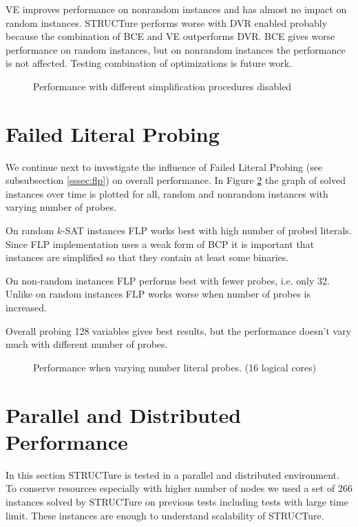 VE improves performance on nonrandom instances and has almost no
impact on random instances. STRUCTure performs worse with DVR
enabled probably because the combination of BCE and VE outperforms
DVR. BCE gives worse performance on random instances, but on
nonrandom instances the performance is not affected. Testing
combination of optimizations is future work.

\begin{figure}
  \centering
  \caption{Performance with different simplification procedures disabled}
  \label{fig:disable}
\end{figure}


\section{Failed Literal Probing}

We continue next to investigate the influence of Failed
Literal Probing (see subsubsection \ref{sssec:flp}) on overall
performance. In Figure \ref{fig:flp} the graph of solved instances
over time is plotted for all, random and nonrandom instances with
varying number of probes.

On random $k$-SAT instances FLP works best with high number of
probed literals. Since FLP implementation uses a weak form of BCP
it is important that instances are simplified so that they contain
at least some binaries.

On non-random instances FLP performs best with fewer probes,
i.e. only 32.  Unlike on random instances FLP works worse when
number of probes is increased.

Overall probing 128 variables gives best results, but the performance
doesn't vary much with different number of probes.

\begin{figure}
  \centering
  \caption{Performance when varying number literal probes. (16 logical cores)}
  \label{fig:flp}
\end{figure}


\section{Parallel and Distributed Performance}

In this section STRUCTure is tested in a parallel and distributed
environment. To conserve resources especially with higher number
of nodes we used a set of 266 instances solved by STRUCTure on
previous tests including tests with large time limit. These instances
are enough to understand scalability of STRUCTure.

